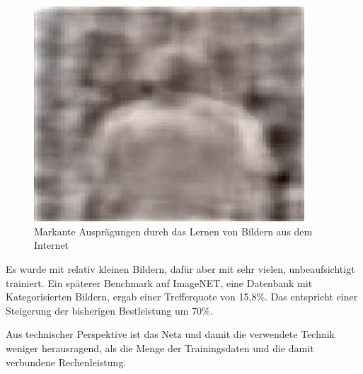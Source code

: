 \begin{figure}
{\begin{minipage}{0.33\textwidth}
	\includegraphics[width=0.9\textwidth]{images/neuron-body.jpg}\end{minipage}}
\caption{Markante Ausprägungen durch das Lernen von Bildern aus dem Internet \citep{googleimage}}
\label{fig:neurons-google}
\end{figure}

Es wurde mit relativ kleinen Bildern, dafür aber mit sehr vielen, unbeaufsichtigt trainiert. Ein späterer Benchmark auf ImageNET, eine Datenbank mit Kategorisierten Bildern, ergab einer Trefferquote von 15,8\%. Das entspricht einer Steigerung der bisherigen Bestleistung um 70\%.

Aus technischer Perspektive ist das Netz und damit die verwendete Technik weniger herausragend, als die Menge der Trainingsdaten und die damit verbundene Rechenleistung.

